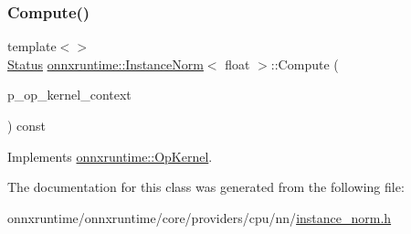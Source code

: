 \mbox{\label{classonnxruntime_1_1InstanceNorm_a218e0c164329c615361772b37086f8ad}} 
\subsubsection{\texorpdfstring{Compute()}{Compute()}\hspace{0.1cm}{\footnotesize\ttfamily [2/2]}}
{\footnotesize\ttfamily template$<$$>$ \\
\mbox{\hyperlink{classonnxruntime_1_1common_1_1Status}{Status}} \mbox{\hyperlink{classonnxruntime_1_1InstanceNorm}{onnxruntime\+::\+Instance\+Norm}}$<$ float $>$\+::Compute (\begin{DoxyParamCaption}\item[{\mbox{\hyperlink{classonnxruntime_1_1OpKernelContext}{Op\+Kernel\+Context}} $\ast$}]{p\+\_\+op\+\_\+kernel\+\_\+context }\end{DoxyParamCaption}) const\hspace{0.3cm}{\ttfamily [virtual]}}



Implements \mbox{\hyperlink{classonnxruntime_1_1OpKernel_a9eca8656a78b1b3ab9d3351a12798650}{onnxruntime\+::\+Op\+Kernel}}.



The documentation for this class was generated from the following file\+:\begin{DoxyCompactItemize}
\item 
onnxruntime/onnxruntime/core/providers/cpu/nn/\mbox{\hyperlink{cpu_2nn_2instance__norm_8h}{instance\+\_\+norm.\+h}}\end{DoxyCompactItemize}
